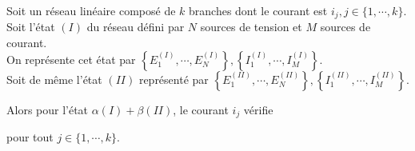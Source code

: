 \documentclass[a4paper]{article}
\begin{document}
\pagestyle{fancy}
\fancyhf{}
\setlength{\headheight}{15pt}

\begin{center}
	\large{}
\end{center}


Soit un réseau linéaire composé de \(k\) branches dont le courant est \(i_j,j\in\lbrace 1,\cdots,k\rbrace\).\\
Soit l'état \((I)\) du réseau défini par \(N\) sources de tension et \(M\) sources de courant.\\
On représente cet état par \(\left\lbrace E_1^{(I)},\cdots,E_N^{(I)}\right\rbrace,\left\lbrace I_1^{(I)},\cdots,I_M^{(I)}\right\rbrace\).\\
Soit de même l'état \((II)\) représenté par \(\left\lbrace E_1^{(II)},\cdots,E_N^{(II)}\right\rbrace,\left\lbrace I_1^{(II)},\cdots,I_M^{(II)}\right\rbrace\).

Alors pour l'état \(\alpha(I)+\beta(II)\), le courant \(i_j\) vérifie \begin{center}\end{center} pour tout \(j\in\lbrace 1,\cdots,k\rbrace\).
\end{document}
